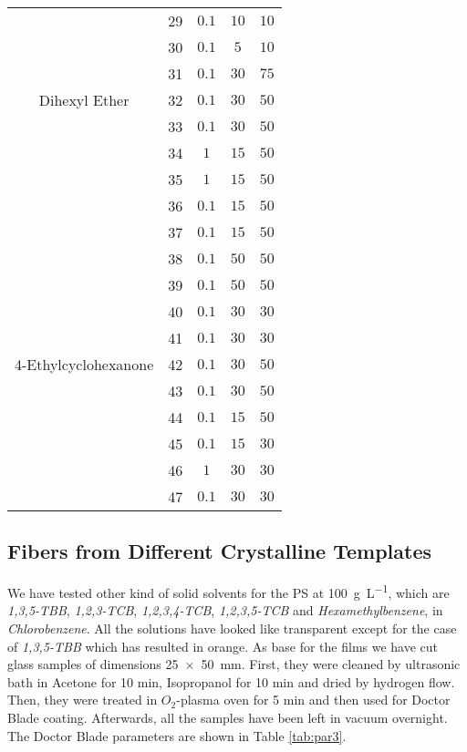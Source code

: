 \documentclass  [
  paper    = a4,
  BCOR     = 10mm,
  twoside,
  fontsize = 12pt,
  fleqn,
  toc      = bibnumbered,
  toc      = listofnumbered,
  numbers  = noendperiod,
  headings = normal,
  listof   = leveldown,
  version  = 3.03
]                                       {scrreprt}
\begin{document}
\begin{table*}[!h]
\begin{tabular}{c|c|ccc}
		& 29 & $0.1$ & $10$ & $10$\\
		& 30 & $0.1$ & $5$ & $10$\\
		& 31 & $0.1$ & $30$ & $75$\\
		\midrule
		\midrule
		Dihexyl Ether & 32 & $0.1$ & $30$ & $50$\\
		& 33 & $0.1$ & $30$ & $50$\\
		& 34 & $1$ & $15$ & $50$\\
		& 35 & $1$ & $15$ & $50$\\
		& 36 & $0.1$ & $15$ & $50$\\
		& 37 & $0.1$ & $15$ & $50$\\
		& 38 & $0.1$ & $50$ & $50$\\
		& 39 & $0.1$ & $50$ & $50$\\
		& 40 & $0.1$ & $30$ & $30$\\
		& 41 & $0.1$ & $30$ & $30$\\
		\midrule
		\midrule
		4-Ethylcyclohexanone & 42 & $0.1$ & $30$ & $50$\\
		& 43 & $0.1$ & $30$ & $50$\\
		& 44 & $0.1$ & $15$ & $50$\\
		& 45 & $0.1$ & $15$ & $30$\\
		& 46 & $1$ & $30$ & $30$\\
		& 47 & $0.1$ & $30$ & $30$\\
		\hline
	\end{tabular}
\end{table*}


		\subsection{Fibers from Different Crystalline Templates}\label{sec:solids}
		
We have tested other kind of solid solvents for the PS at \SI[per-mode=symbol]{100}{\gram\per\liter}, which are \emph{1,3,5-TBB}, \emph{1,2,3-TCB}, \emph{1,2,3,4-TCB}, \emph{1,2,3,5-TCB} and \emph{Hexamethylbenzene}, in \emph{Chlorobenzene}.  All the solutions have looked like transparent except for the case of \emph{1,3,5-TBB} which has resulted in orange. As base for the films we have cut glass samples of dimensions \SI{25x50}{\milli\metre}. First, they were cleaned by ultrasonic bath in Acetone for 10 min, Isopropanol for 10 min and dried by hydrogen flow. Then, they were treated in $O_2$-plasma oven for 5 min and then used for Doctor Blade coating. Afterwards, all the samples have been left in vacuum overnight. The Doctor Blade parameters are shown in Table \ref{tab:par3}.\\
\end{document}
